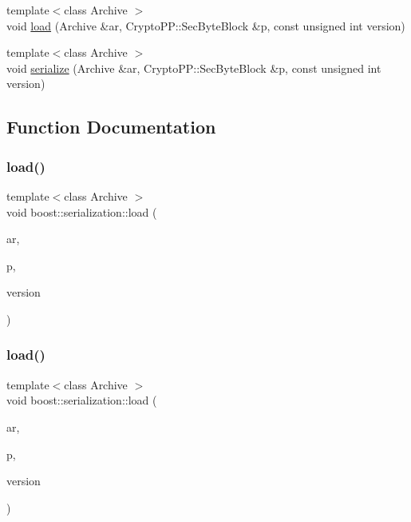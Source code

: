 \begin{DoxyCompactItemize}
\item 
{\footnotesize template$<$class Archive $>$ }\\void \hyperlink{namespaceboost_1_1serialization_ac8d644880f4596e04671aa5db78527ff}{load} (Archive \&ar, Crypto\+P\+P\+::\+Sec\+Byte\+Block \&p, const unsigned int version)
\item 
{\footnotesize template$<$class Archive $>$ }\\void \hyperlink{namespaceboost_1_1serialization_a62de9ba81b8b564ae450120250a7d597}{serialize} (Archive \&ar, Crypto\+P\+P\+::\+Sec\+Byte\+Block \&p, const unsigned int version)
\end{DoxyCompactItemize}


\subsection{Function Documentation}
\mbox{\label{namespaceboost_1_1serialization_ac9d9d4bc06458befc413756326393db1}} 
\subsubsection{\texorpdfstring{load()}{load()}\hspace{0.1cm}{\footnotesize\ttfamily [1/6]}}
{\footnotesize\ttfamily template$<$class Archive $>$ \\
void boost\+::serialization\+::load (\begin{DoxyParamCaption}\item[{Archive \&}]{ar,  }\item[{N\+T\+L\+::\+ZZ \&}]{p,  }\item[{const unsigned int}]{version }\end{DoxyParamCaption})}

\mbox{\label{namespaceboost_1_1serialization_a010ed145b746e6d7c5d4e643ff39145b}} 
\subsubsection{\texorpdfstring{load()}{load()}\hspace{0.1cm}{\footnotesize\ttfamily [2/6]}}
{\footnotesize\ttfamily template$<$class Archive $>$ \\
void boost\+::serialization\+::load (\begin{DoxyParamCaption}\item[{Archive \&}]{ar,  }\item[{N\+T\+L\+::\+Z\+Z\+\_\+p \&}]{p,  }\item[{const unsigned int}]{version }\end{DoxyParamCaption})}

